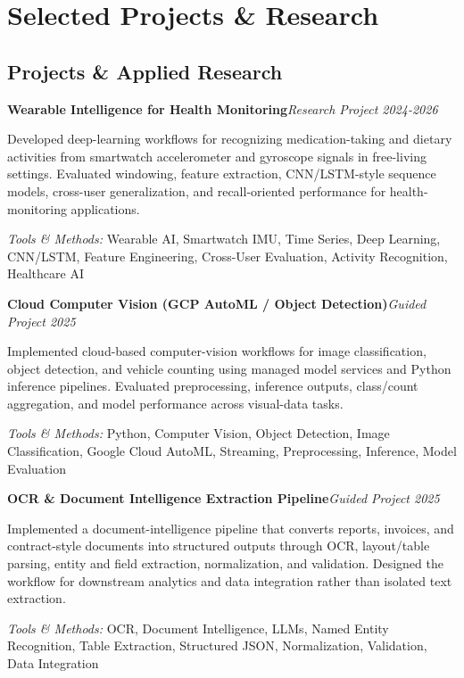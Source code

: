 \documentclass[9pt,letterpaper]{extarticle}
\newcommand{\entry}[2]{\Needspace{4\baselineskip}\textbf{#1}\hfill\textit{#2}\par}
\begin{document}
\section{Selected Projects \& Research}
\subsection{Projects \& Applied Research}
\entry{Wearable Intelligence for Health Monitoring}{Research Project \textbar{} 2024-2026}
Developed deep-learning workflows for recognizing medication-taking and dietary activities from smartwatch accelerometer and gyroscope signals in free-living settings. Evaluated windowing, feature extraction, CNN/LSTM-style sequence models, cross-user generalization, and recall-oriented performance for health-monitoring applications.\par
{\small\textit{Tools \& Methods:} Wearable AI, Smartwatch IMU, Time Series, Deep Learning, CNN/LSTM, Feature Engineering, Cross-User Evaluation, Activity Recognition, Healthcare AI\par}
\vspace{1pt}
\entry{Cloud Computer Vision (GCP AutoML / Object Detection)}{Guided Project \textbar{} 2025}
Implemented cloud-based computer-vision workflows for image classification, object detection, and vehicle counting using managed model services and Python inference pipelines. Evaluated preprocessing, inference outputs, class/count aggregation, and model performance across visual-data tasks.\par
{\small\textit{Tools \& Methods:} Python, Computer Vision, Object Detection, Image Classification, Google Cloud AutoML, Streaming, Preprocessing, Inference, Model Evaluation\par}
\vspace{1pt}
\entry{OCR \& Document Intelligence Extraction Pipeline}{Guided Project \textbar{} 2025}
Implemented a document-intelligence pipeline that converts reports, invoices, and contract-style documents into structured outputs through OCR, layout/table parsing, entity and field extraction, normalization, and validation. Designed the workflow for downstream analytics and data integration rather than isolated text extraction.\par
{\small\textit{Tools \& Methods:} OCR, Document Intelligence, LLMs, Named Entity Recognition, Table Extraction, Structured JSON, Normalization, Validation, Data Integration\par}
\vspace{1pt}
\end{document}
